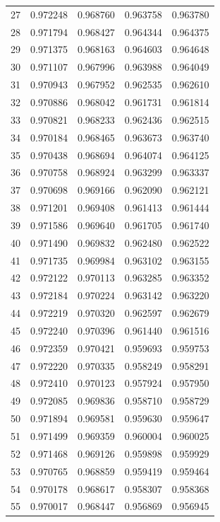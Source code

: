 \begin{table}
\begin{tabular}{rrrrr}
27 & 0.972248 & 0.968760 & 0.963758 & 0.963780 \\
28 & 0.971794 & 0.968427 & 0.964344 & 0.964375 \\
29 & 0.971375 & 0.968163 & 0.964603 & 0.964648 \\
30 & 0.971107 & 0.967996 & 0.963988 & 0.964049 \\
31 & 0.970943 & 0.967952 & 0.962535 & 0.962610 \\
32 & 0.970886 & 0.968042 & 0.961731 & 0.961814 \\
33 & 0.970821 & 0.968233 & 0.962436 & 0.962515 \\
34 & 0.970184 & 0.968465 & 0.963673 & 0.963740 \\
35 & 0.970438 & 0.968694 & 0.964074 & 0.964125 \\
36 & 0.970758 & 0.968924 & 0.963299 & 0.963337 \\
37 & 0.970698 & 0.969166 & 0.962090 & 0.962121 \\
38 & 0.971201 & 0.969408 & 0.961413 & 0.961444 \\
39 & 0.971586 & 0.969640 & 0.961705 & 0.961740 \\
40 & 0.971490 & 0.969832 & 0.962480 & 0.962522 \\
41 & 0.971735 & 0.969984 & 0.963102 & 0.963155 \\
42 & 0.972122 & 0.970113 & 0.963285 & 0.963352 \\
43 & 0.972184 & 0.970224 & 0.963142 & 0.963220 \\
44 & 0.972219 & 0.970320 & 0.962597 & 0.962679 \\
45 & 0.972240 & 0.970396 & 0.961440 & 0.961516 \\
46 & 0.972359 & 0.970421 & 0.959693 & 0.959753 \\
47 & 0.972220 & 0.970335 & 0.958249 & 0.958291 \\
48 & 0.972410 & 0.970123 & 0.957924 & 0.957950 \\
49 & 0.972085 & 0.969836 & 0.958710 & 0.958729 \\
50 & 0.971894 & 0.969581 & 0.959630 & 0.959647 \\
51 & 0.971499 & 0.969359 & 0.960004 & 0.960025 \\
52 & 0.971468 & 0.969126 & 0.959898 & 0.959929 \\
53 & 0.970765 & 0.968859 & 0.959419 & 0.959464 \\
54 & 0.970178 & 0.968617 & 0.958307 & 0.958368 \\
55 & 0.970017 & 0.968447 & 0.956869 & 0.956945 \\

\end{tabular}
\end{table}
